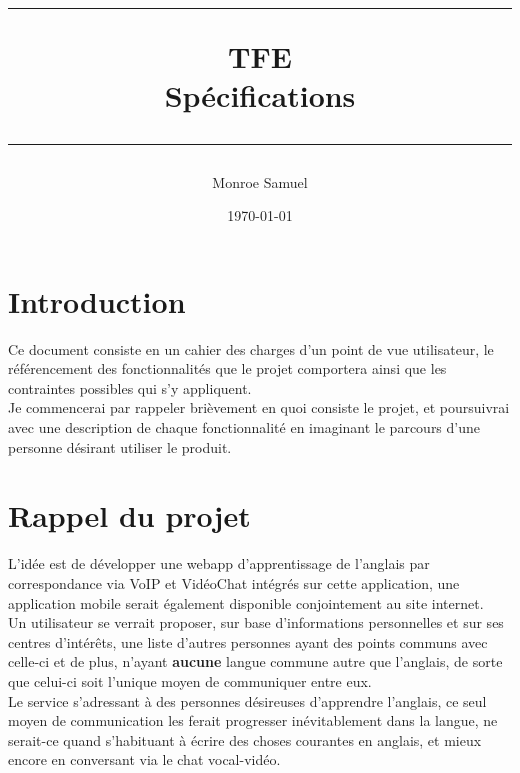 \documentclass[a4paper,10pt,final,fleqn]{article}
\title{
\parbox{15cm}
{ %
  \vspace{3cm}
	\begin{center}\sf\bfseries\Huge
		\rule{15cm}{1pt}
		\medskip
		TFE \\
		\huge Spécifications
		\vspace{.5cm}
		\rule{15cm}{1pt}
	\end{center}
	\vspace{3cm}
 }}
\author{Monroe Samuel}
\date{\today}
\begin{document}
\maketitle
\newpage




	\section{Introduction}

		Ce document consiste en un cahier des charges d'un point de vue utilisateur, le référencement des fonctionnalités que le projet comportera ainsi que les contraintes possibles qui s'y appliquent.\\

		Je commencerai par rappeler brièvement en quoi consiste le projet, et poursuivrai avec une description de chaque fonctionnalité en imaginant le parcours d'une personne désirant utiliser le produit.\\

	\section{Rappel du projet}

		L'idée est de développer une webapp d'apprentissage de l'anglais par correspondance via VoIP et VidéoChat intégrés sur cette application, une application mobile serait également disponible conjointement au site internet.\\

		Un utilisateur se verrait proposer, sur base d'informations personnelles et sur ses centres d'intérêts, une liste d'autres personnes ayant des points communs avec celle-ci et de plus, n'ayant \textbf{aucune} langue commune autre que l'anglais, de sorte que celui-ci soit l'unique moyen de communiquer entre eux.\\
		Le service s'adressant à des personnes désireuses d'apprendre l'anglais, ce seul moyen de communication les ferait progresser inévitablement dans la langue, ne serait-ce quand s'habituant à écrire des choses courantes en anglais, et mieux encore en conversant via le chat vocal-vidéo.\\
\end{document}
